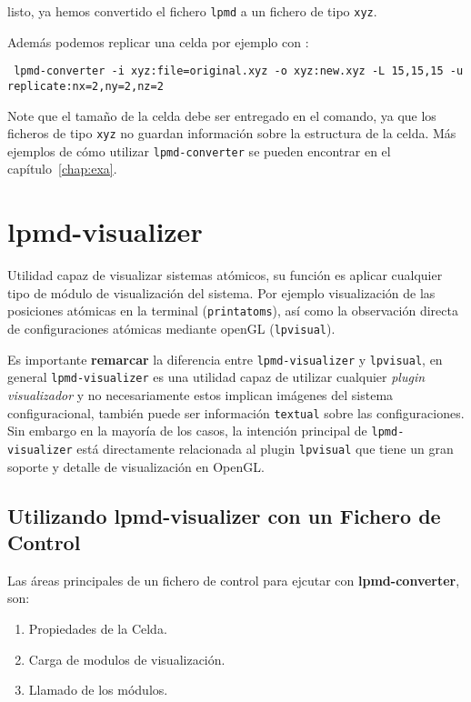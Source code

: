 \noindent
listo, ya hemos convertido el fichero \verb|lpmd| a un fichero de tipo \verb|xyz|.

Adem\'as podemos replicar una celda por ejemplo con :

\begin{verbatim}
 lpmd-converter -i xyz:file=original.xyz -o xyz:new.xyz -L 15,15,15 -u replicate:nx=2,ny=2,nz=2
\end{verbatim}

Note que el tamaño de la celda debe ser entregado en el comando, ya que los ficheros de tipo \verb|xyz| no guardan informaci\'on sobre la estructura de la celda. M\'as ejemplos de c\'omo utilizar \verb|lpmd-converter| se pueden encontrar en el cap\'itulo~\ref{chap:exa}.

\section{lpmd-visualizer}\label{sec:lpmd-visualizer}
Utilidad capaz de visualizar sistemas at\'omicos, su funci\'on es aplicar cualquier tipo de m\'odulo de visualizaci\'on del sistema. Por ejemplo visualizaci\'on de las posiciones at\'omicas en la terminal (\verb|printatoms|), as\'i como la observaci\'on directa de configuraciones at\'omicas mediante openGL (\verb|lpvisual|). 

Es importante \textbf{remarcar} la diferencia entre \verb|lpmd-visualizer| y \verb|lpvisual|, en general \verb|lpmd-visualizer| es una utilidad capaz de utilizar cualquier \textit{plugin visualizador} y no necesariamente estos implican im\'agenes del sistema configuracional, tambi\'en puede ser informaci\'on \verb|textual| sobre las configuraciones. Sin embargo en la mayor\'ia de los casos, la intenci\'on principal de \verb|lpmd-visualizer| est\'a directamente relacionada al plugin \verb|lpvisual| que tiene un gran soporte y detalle de visualizaci\'on en OpenGL.

\subsection{Utilizando lpmd-visualizer con un Fichero de Control}

Las \'areas principales de un fichero de control para ejcutar con \textbf{lpmd-converter}, son:

\begin{enumerate}
 \item Propiedades de la Celda.
 \item Carga de modulos de visualizaci\'on.
 \item Llamado de los m\'odulos.
\end{enumerate}

